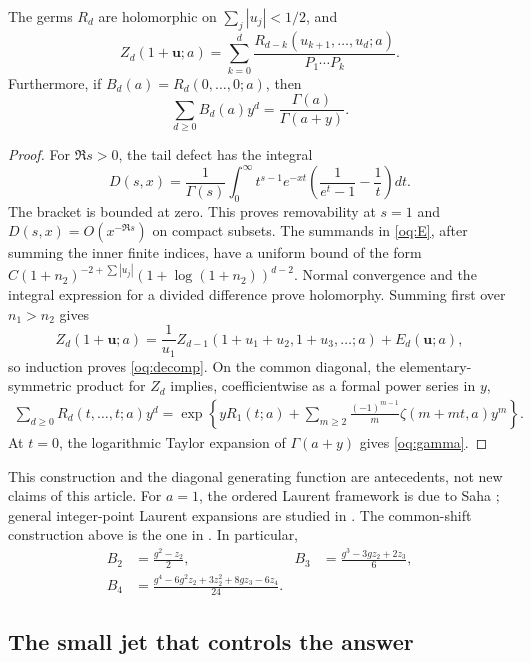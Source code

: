 \begin{lemma}\label{oq:regular}
The germs $R_d$ are holomorphic on $\sum_j|u_j|<1/2$, and
\begin{equation}\label{oq:decomp}
 Z_d(1+\mathbf u;a)=
 \sum_{k=0}^d\frac{R_{d-k}(u_{k+1},\ldots,u_d;a)}{P_1\cdots P_k}.
\end{equation}
Furthermore, if $B_d(a)=R_d(0,\ldots,0;a)$, then
\begin{equation}\label{oq:gamma}
 \sum_{d\ge0}B_d(a)y^d=\frac{\Gamma(a)}{\Gamma(a+y)}.
\end{equation}
\end{lemma}
\begin{proof}
For $\Re s>0$, the tail defect has the integral
\[
 D(s,x)=\frac1{\Gamma(s)}\int_0^\infty
 t^{s-1}e^{-xt}\left(\frac1{e^t-1}-\frac1t\right)dt.
\]
The bracket is bounded at zero. This proves removability at $s=1$
and $D(s,x)=O(x^{-\Re s})$ on compact subsets. The summands in
\eqref{oq:E}, after summing the inner finite indices, have a
uniform bound of the form
$C(1+n_2)^{-2+\sum|u_j|}(1+\log(1+n_2))^{d-2}$.
Normal convergence and the integral expression for a divided difference
prove holomorphy. Summing first over $n_1>n_2$ gives
\[
 Z_d(1+\mathbf u;a)=\frac1{u_1}
 Z_{d-1}(1+u_1+u_2,1+u_3,\ldots;a)+E_d(\mathbf u;a),
\]
so induction proves \eqref{oq:decomp}. On the common diagonal,
the elementary-symmetric product for $Z_d$ implies, coefficientwise
as a formal power series in $y$,
\begin{align}\label{oq:diaggenerator}
 \sum_{d\ge0}R_d(t,\ldots,t;a)y^d
 =\exp\left\{yR_1(t;a)+
 \sum_{m\ge2}\frac{(-1)^{m-1}}m\zeta(m+mt,a)y^m\right\}.
\end{align}
At $t=0$, the logarithmic Taylor expansion of $\Gamma(a+y)$
gives \eqref{oq:gamma}.
\end{proof}

This construction and the diagonal generating function are antecedents,
not new claims of this article. For $a=1$, the ordered Laurent framework
is due to Saha \cite{Saha}; general integer-point Laurent expansions are
studied in \cite{MOW}. The common-shift construction above is the one
in \cite{RepoOrdered}. In particular,
\begin{align}
 B_2&=\frac{g^2-z_2}{2},&
 B_3&=\frac{g^3-3gz_2+2z_3}{6},\label{oq:B23}\\
 B_4&=\frac{g^4-6g^2z_2+3z_2^2+8gz_3-6z_4}{24}.
 \label{oq:B4}
\end{align}

\subsection{The small jet that controls the answer}

